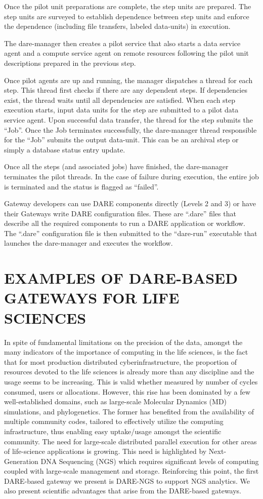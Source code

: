 \documentclass[]{svjour3}
\begin{document}
Once the pilot unit preparations are complete, the step units are prepared. The
step units are surveyed to establish dependence between step units and enforce
the dependence (including file transfers, labeled data-units) in execution. 

The dare-manager then creates a pilot service that also starts a data
service agent and a compute service agent on remote resources following the
pilot unit descriptions prepared in the previous step.

Once pilot agents are up and running, the manager dispatches a thread
for each step. This thread first checks if there are any dependent
steps. If dependencies exist, the thread waits until all dependencies
are satisfied. When each step execution starts, input data units for
the step are submitted to a pilot data service agent. %
Upon successful data transfer, the thread for the step submits the
``Job''. Once the Job terminates successfully, the dare-manager thread responsible
for the ``Job'' submits the output data-unit. This can be an archival step or simply
a database status entry update.

Once all the steps (and associated jobs) have finished, the dare-manager terminates
the pilot threads. In the case of failure during execution, the entire job is terminated
and the status is flagged as ``failed''.

Gateway developers can use DARE components directly (Levels 2 and 3) or have their
Gateways write DARE configuration files. These are ``.dare'' files that describe
all the required components to run a DARE application or workflow. The ``.dare''
configuration file is then submitted to the ``dare-run'' executable that launches
the dare-manager and executes the workflow.

\section{EXAMPLES OF DARE-BASED GATEWAYS FOR LIFE SCIENCES}

In spite of fundamental limitations on the precision of the data,
amongst the many indicators of the importance of computing in the life
sciences, is the fact that for most production distributed
cyberinfrastructure, the proportion of resources devoted to the life
sciences is already more than any discipline and the usage seems to be
increasing. This is valid whether measured by number of cycles
consumed, users or allocations.  However, this rise has been dominated
by a few well-established domains, such as large-scale Molecular
Dynamics (MD) simulations, and phylogenetics.  The former has
benefited from the availability of multiple community codes, tailored
to effectively utilize the computing infrastructure, thus enabling
easy uptake/usage amongst the scientific community.  The need for
large-scale distributed parallel execution for other areas of
life-science applications is growing.  This need is highlighted by
Next-Generation DNA Sequencing (NGS) which requires significant levels
of computing coupled with large-scale management and storage.
Reinforcing this point, the first DARE-based gateway we present is
DARE-NGS to support NGS analytics. We also present scientific
advantages that arise from the DARE-based gateways.
\end{document}
